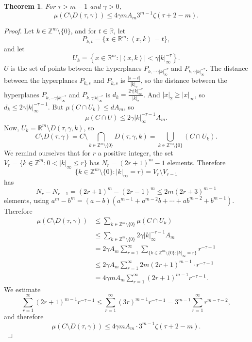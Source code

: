 \documentclass{article}
\newcommand{\inner}[2]{\left\langle #1, #2 \right\rangle}
\newtheorem{theorem}{Theorem}
\theoremstyle{definition}
\begin{document}
\begin{theorem}
For $\tau>m-1$ and $\gamma>0$,
\[
\mu(C \setminus D(\tau,\gamma)) \leq 4\gamma m A_m  3^{m-1} \zeta(\tau+2-m).
\]
\label{Dtaugamma}
\end{theorem}
\begin{proof}
Let $k \in \mathbb{Z}^m \setminus \{0\}$, and
for $t \in \mathbb{R}$, let 
\[
P_{k,t} = \{x \in \mathbb{R}^m: \inner{x}{k} = t\},
\]
and let
\[
U_k = \left\{ x \in \mathbb{R}^m : |\inner{x}{k}| < \gamma |k|_\infty^{-\tau}  \right\}.
\]
$U$ is the set of points between the hyperplanes $P_{k,- \gamma |k|_\infty^{-\tau} }$ and $P_{k,\gamma |k|_\infty^{-\tau} }$.
The distance between the hyperplanes $P_{k,s}$ and $P_{k,s}$ is $\frac{|s-t|}{|k|_2}$, so
the distance between the hyperplanes $P_{k,- \gamma |k|_\infty^{-\tau} }$ and $P_{ k,\gamma |k|_\infty^{-\tau} }$ is
$d_k=\frac{2\gamma |k|_\infty^{-\tau}}{|k|_2}$. And $|x|_2 \geq |x|_\infty$, so
$d_k \leq 2\gamma |k|_\infty^{-\tau-1}$. 
But $\mu(C \cap U_k) \leq d A_m$, so
\[
\mu(C \cap U) \leq 2\gamma |k|_\infty^{-\tau-1} A_m.
\]
Now, $U_k = \mathbb{R}^m \setminus D(\tau,\gamma,k)$, so 
\[
C \setminus D(\tau,\gamma) = C \setminus \bigcap_{k \in \mathbb{Z}^m \setminus \{0\}} D(\tau,\gamma,k)
=\bigcup_{k \in \mathbb{Z}^m \setminus \{0\}} (C \cap U_k).
\]
We remind ourselves that for $r$ a positive integer,
the set $V_r = \{k \in \mathbb{Z}^m: 0 < |k|_\infty \leq r\}$ has 
$N_r=(2r+1)^m-1$ elements. 
Therefore 
\[
\{k \in \mathbb{Z}^m \setminus \{0\}: |k|_\infty = r\} = V_r \setminus V_{r-1}
\]
has
\[
N_r-N_{r-1}=(2r+1)^m - (2r-1)^m \leq 2m (2r+3)^{m-1}
\]
elements,
using $a^m-b^m=(a-b)(a^{m-1}+a^{m-2}b + \cdots + ab^{m-2}+b^{m-1})$. Therefore
\begin{align*}
\mu(C \setminus D(\tau,\gamma))&\leq \sum_{k \in  \mathbb{Z}^m \setminus \{0\}} \mu(C \cap U_k)\\
&\leq \sum_{k \in \mathbb{Z}^m \setminus \{0\}} 2\gamma |k|_\infty^{-\tau-1} A_m\\
&=2\gamma A_m \sum_{r=1}^\infty \sum_{\{k \in \mathbb{Z}^m \setminus \{0\}: |k|_\infty = r\}}  r^{-\tau-1}\\
&\leq 2\gamma A_m \sum_{r=1}^\infty 2m (2r+1)^{m-1} \cdot  r^{-\tau-1}\\
&=4\gamma m A_m \sum_{r=1}^\infty (2r+1)^{m-1} r^{-\tau-1}.
\end{align*}
We estimate
\[
\sum_{r=1}^\infty (2r+1)^{m-1} r^{-\tau-1} \leq \sum_{r=1}^\infty (3r)^{m-1} r^{-\tau-1}
=3^{m-1} \sum_{r=1}^\infty r^{m-\tau-2},
\]
and therefore
\[
\mu(C \setminus D(\tau,\gamma)) \leq 4\gamma m A_m \cdot 3^{m-1} \zeta(\tau+2-m).
\]
\end{proof}
\end{document}
